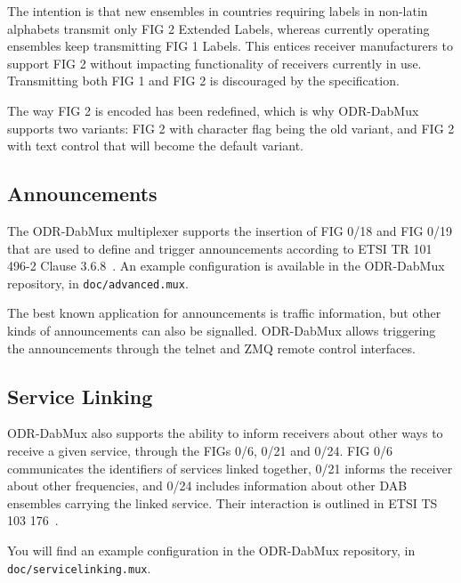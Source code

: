 The intention is that new ensembles in countries requiring labels in non-latin
alphabets transmit only FIG 2 Extended Labels, whereas currently operating
ensembles keep transmitting FIG 1 Labels. This entices receiver manufacturers to
support FIG 2 without impacting functionality of receivers currently in use.
Transmitting both FIG 1 and FIG 2 is discouraged by the specification.

The way FIG 2 is encoded has been redefined, which is why ODR-DabMux supports
two variants: FIG 2 with character flag being the old variant, and FIG 2 with
text control that will become the default variant.

\subsection{Announcements}
The ODR-DabMux multiplexer supports the insertion of FIG 0/18 and FIG 0/19 that
are used to define and trigger announcements according to ETSI TR 101 496-2
Clause 3.6.8~\cite{etsitr1014962}.
An example configuration is available in the ODR-DabMux repository, in
\texttt{doc/advanced.mux}.

The best known application for announcements is traffic information, but other
kinds of announcements can also be signalled. ODR-DabMux allows triggering the
announcements through the telnet and ZMQ remote control interfaces.

\subsection{Service Linking}
ODR-DabMux also supports the ability to inform receivers about other ways to
receive a given service, through the FIGs 0/6, 0/21 and 0/24. FIG 0/6
communicates the identifiers of services linked together, 0/21 informs the
receiver about other frequencies, and 0/24 includes information about other DAB
ensembles carrying the linked service.
Their interaction is outlined in ETSI TS 103 176~\cite{etsits103176}.

You will find an example configuration in the ODR-DabMux repository, in
\texttt{doc/servicelinking.mux}.

